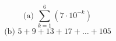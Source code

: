 \documentclass{article}
\begin{document}
\[ \text{(a) } \sum_{k=1}^{6} (7 \cdot 10^{-k}) \]
\[ \text{(b) }  5 + 9 + 13 + 17 + \dots + 105 \]
\end{document}
